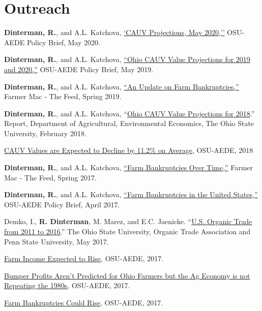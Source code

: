 \documentclass[letterpaper]{article}
\renewenvironment{itemize}{
  \begin{list}{}{
    \setlength{\leftmargin}{1.5em}
  }
}{
  \end{list}
}
\begin{document}
\section*{Outreach}

\begin{itemize}
\item \textbf{Dinterman, R.}, and A.L. Katchova, \href{https://aede.osu.edu/about-us/publications/cauv-projections-may-2020}{`CAUV Projections, May 2020,''} OSU-AEDE Policy Brief, May 2020.
\item \textbf{Dinterman, R.}, and A.L. Katchova, \href{https://aede.osu.edu/sites/aede/files/publication_files/CAUVProjectionsReport2019.pdf}{``Ohio CAUV Value Projections for 2019 and 2020,''} OSU-AEDE Policy Brief, May 2019.
\item \textbf{Dinterman, R.}, and A.L. Katchova, \href{https://www.farmermac.com/wp-content/uploads/The-Feed-Spring-2019.pdf}{``An Update on Farm Bankruptcies,''} Farmer Mac - The Feed, Spring 2019.
\item \textbf{Dinterman, R.}, and A.L. Katchova, ``\href{https://aede.osu.edu/sites/aede/files/publication_files/2018CAUVProjectionsReport.pdf}{Ohio CAUV Value Projections for 2018}.'' Report, Department of Agricultural, Environmental Economics, The Ohio State University, February 2018.
\item \href{https://aede.osu.edu/news/cauv-values-agricultural-land-are-expected-decline-112-acre-average}{CAUV Values are Expected to Decline by 11.2\% on Average}, OSU-AEDE, 2018
\item \textbf{Dinterman, R.}, and A.L. Katchova, \href{https://www.farmermac.com/wp-content/uploads/The-Feed-Spring-2017.pdf}{``Farm Bankruptcies Over Time,''} Farmer Mac - The Feed, Spring 2017.
\item \textbf{Dinterman, R.}, and A.L. Katchova, \href{https://aede.osu.edu/sites/aede/files/publication_files/Farm%20Bankruptcies%20-%20Policy%20Brief.pdf}{``Farm Bankruptcies in the United States,''} OSU-AEDE Policy Brief, April 2017.
\item Demko, I., \textbf{R. Dinterman}, M. Marez, and E.C. Jaenicke. ``\href{https://ota.com/sites/default/files/indexed_files/OTATradeReport_10-30-2017.pdf}{U.S. Organic Trade from 2011 to 2016}.'' The Ohio State University, Organic Trade Association and Penn State University, May 2017.
\item \href{https://aede.osu.edu/news/farm-income-expected-rise}{Farm Income Expected to Rise}, OSU-AEDE, 2017.
\item \href{https://aede.osu.edu/news/bumper-profits-arent-predicted-ohio-farmers-ag-economy-not-repeating-1980s}{Bumper Profits Aren't Predicted for Ohio Farmers but the Ag Economy is not Repeating the 1980s}, OSU-AEDE, 2017.
\item \href{https://aede.osu.edu/news/farm-bankruptcies-could-rise}{Farm Bankruptcies Could Rise}, OSU-AEDE, 2017.
\end{itemize}
\end{document}
